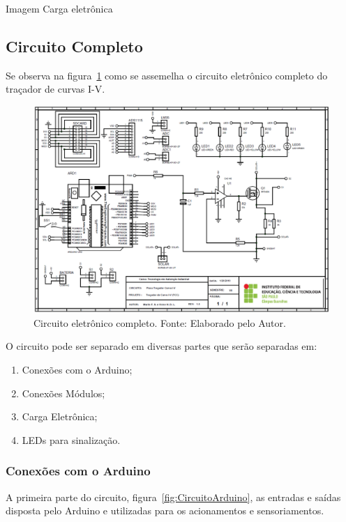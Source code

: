 Imagem Carga eletrônica

\subsection{Circuito Completo}

Se observa na figura~\ref{fig:Circuito} como se assemelha o circuito eletrônico completo do traçador de curvas I-V.


\FloatBarrier
\begin{figure}[!htbp]
	\centering
	\includegraphics[scale=0.3]{imagens/CircuitoCompleto.png}
	\caption{Circuito eletrônico completo. Fonte: Elaborado pelo Autor. 	}
	\label{fig:Circuito}
\end{figure}
\FloatBarrier

O circuito pode ser separado em diversas partes que serão separadas em:
\begin{enumerate}
	\item Conexões com o Arduino;
	\item Conexões Módulos;
	\item Carga Eletrônica;
	\item LEDs para sinalização.
\end{enumerate}

	
\subsubsection{Conexões com o Arduino}

A primeira parte do circuito,  figura~\ref{fig:CircuitoArduino}, as entradas e saídas disposta pelo Arduino e utilizadas para os acionamentos e sensoriamentos.


